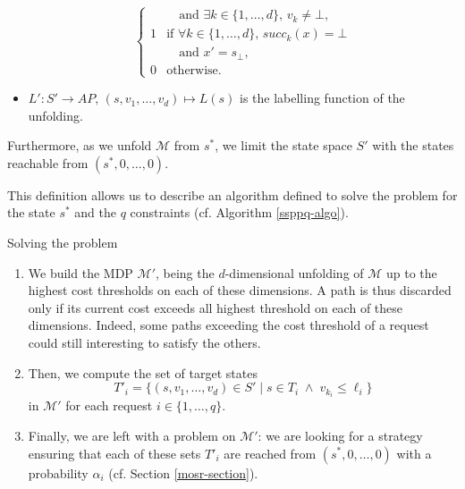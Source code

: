 \begin{definition}
\begin{itemize}
\[\begin{cases}
      & \quad \text{and }\exists k \in \{1, \dots, d\}, \, v_k \neq \bot, \\
      1
      & \text{if } \forall k \in \{1, \dots, d\},\, succ_k(x) = \bot \\
      & \quad \text{and } x' = s_\bot,\\
      0 & \text{otherwise.}
    \end{cases}
    \]
    \item $L': S' \rightarrow AP,\, (s, v_1, \dots, v_d) \mapsto L(s)$ is the labelling function of the unfolding.
  \end{itemize}
    Furthermore, as we unfold $\mathcal{M}$ from $s^*$, we limit the state space $S'$ with the states reachable from $(s^*, 0, \dots, 0)$.
\end{definition}

This definition allows us to describe an algorithm defined to solve the \SSPPQ{} problem for the state $s^*$ and the $q$ constraints (cf. Algorithm \ref{ssppq-algo}).

\begin{algorithm}
\caption{Solving the \SSPPQ{} problem}\label{ssppq-algo}
\begin{enumerate}
\item We build the MDP $\mathcal{M}'$, being the $d$-dimensional unfolding of $\mathcal{M}$ up to the highest cost thresholds on each of these dimensions.
  A path is thus discarded only if its current cost exceeds all highest threshold on each of these dimensions.
  Indeed, some paths exceeding the cost threshold of a request could still interesting to satisfy the others.
  \item Then, we compute the set of target states \[T'_i = \{ (s, v_1, \dots, v_d) \in S' \; | \; s \in T_i  \; \wedge \; v_{k_i} \leq \ell_i \}\] in $\mathcal{M}'$ for each request $i \in \{1, \dots, q\}$.
  \item Finally, we are left with a \MOSR{} problem on $\mathcal{M}'$: we are looking for a strategy ensuring that each of these sets $T'_i$ are reached from $(s^*, 0, \dots, 0)$ with a probability $\alpha_i$ (cf. Section \ref{mosr-section}).
\end{enumerate}
\end{algorithm}

